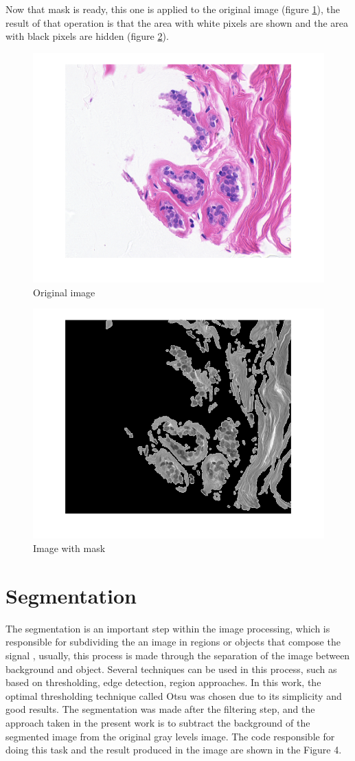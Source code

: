 \documentclass[conference]{IEEEtran}
\begin{document}
	\par Now that mask is ready, this one is applied to the original image (figure \ref{fig:original}), the result of that operation is that the area with white pixels are shown and the area with black pixels are hidden (figure \ref{fig:maskedimage}).

	\begin{figure}[h]
		\centering
		\includegraphics[width=0.7\linewidth]{images/fourrierFiltering/original}
		\caption{Original image}
		\label{fig:original}
	\end{figure}

	\begin{figure}[h]
		\centering
		\includegraphics[width=0.7\linewidth]{images/fourrierFiltering/maskedImage}
		\caption{Image with mask}
		\label{fig:maskedimage}
	\end{figure}
\section{Segmentation}
\par The segmentation is an important step within the image processing, which is responsible for subdividing the an image in regions or objects that compose the signal \cite{Gonzalez:2006:DIP:1076432}, usually, this process is made through the separation of the image between background and object. Several techniques can be used in this process, such as based on thresholding, edge detection, region approaches. In this work, the optimal thresholding technique called Otsu was chosen due to its simplicity and good results. The segmentation was made after the filtering step, and the approach taken in the present work is to subtract the background of the segmented image from the original gray levels image. The code responsible for doing this task and the result produced in the image are shown in the Figure 4.
\end{document}
